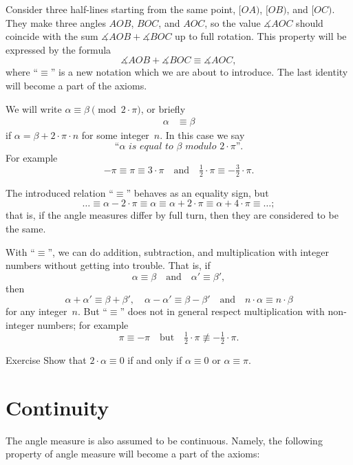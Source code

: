 Consider three half-lines starting from the same point, $[O A)$, $[O B)$, and $[O C)$.
They make three angles $A O B$, $B O C$, and $A O C$,
so the value $\measuredangle A O C$ should coincide with
the sum $\measuredangle A O B+\measuredangle B O C$ up to full rotation.
This property will be expressed by the formula 
$$\measuredangle A O B+\measuredangle B O C\equiv \measuredangle A O C,$$
where ``$\equiv$'' is a new notation which we are about to introduce.
The last identity will become a part of the axioms.

We will write $\alpha\equiv\beta\pmod{2\cdot\pi}$, or briefly
\begin{align*}
\alpha&\equiv\beta
\end{align*}
if $\alpha=\beta+2\cdot\pi\cdot n$
for some integer~$n$.
In this case we say 
$$\textit{``$\alpha$ is equal to $\beta$ modulo $2\cdot\pi$''}.$$
For example 
$$-\pi
\equiv
\pi\equiv 3\cdot\pi
\quad
\text{and}
\quad
\tfrac12\cdot\pi
\equiv
-\tfrac32\cdot\pi.$$

The introduced relation ``$\equiv$'' behaves as an equality sign,
but
\[\dots\equiv\alpha-2\cdot\pi\equiv \alpha\equiv \alpha+2\cdot\pi\equiv \alpha+4\cdot\pi\equiv\dots;\] 
that is, if the angle measures differ by full turn,
then they are considered to be the same.

With ``$\equiv$'', we can do addition, subtraction, and multiplication with integer numbers without getting into trouble.
That is, if
$$\alpha\equiv\beta
\quad
\text{and}
\quad
\alpha'\equiv \beta',$$ 
then
$$\alpha+\alpha'\equiv\beta+\beta',
\quad
\alpha-\alpha'\equiv \beta-\beta'
\quad 
\text{and}
\quad
n\cdot\alpha\equiv n\cdot\beta$$
for any integer~$n$.
But ``$\equiv$'' does not in general respect multiplication with non-integer numbers; for example 
$$\pi
\equiv 
-\pi
\quad
\text{but}
\quad
\tfrac12\cdot\pi
\not\equiv
-\tfrac12\cdot\pi.$$ 

\begin{thm}{Exercise}\label{ex:2a=0}
Show that $2\cdot\alpha\equiv0$ if and only if $\alpha\equiv0$ or $\alpha\equiv\pi$.
\end{thm}

\section*{Continuity}

The angle measure is also assumed to be continuous.
Namely, the following property of angle measure will become a part of the axioms:

